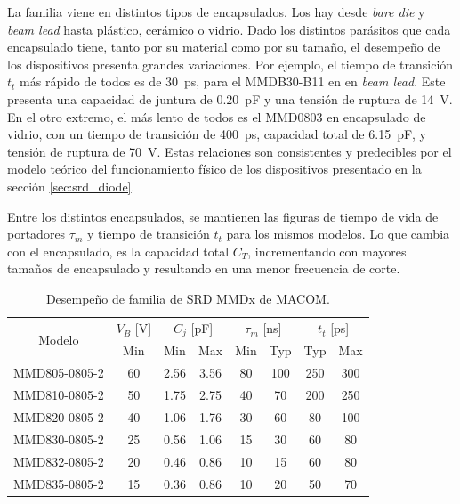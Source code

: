 La familia viene en distintos tipos de encapsulados. Los hay desde \textit{bare
die} y \textit{beam lead} hasta plástico, cerámico o vidrio. Dado los distintos
parásitos que cada encapsulado tiene, tanto por su material como por su tamaño,
el desempeño de los dispositivos presenta grandes variaciones. Por ejemplo, el
tiempo de transición $t_t$ más rápido de todos es de \qty{30}{\pico\second},
para el MMDB30-B11 en en \textit{beam lead}. Este presenta una capacidad de
juntura de \qty{0.20}{\pico\farad} y una tensión de ruptura de \qty{14}{\volt}.
En el otro extremo, el más lento de todos es el MMD0803 en encapsulado de
vidrio, con un tiempo de transición de \qty{400}{\pico\second}, capacidad total
de \qty{6.15}{\pico\farad}, y tensión de ruptura de \qty{70}{\volt}. Estas
relaciones son consistentes y predecibles por el modelo teórico del
funcionamiento físico de los dispositivos presentado en la sección
\ref{sec:srd_diode}.

Entre los distintos encapsulados, se mantienen las figuras de tiempo de vida de
portadores $\tau_m$ y tiempo de transición $t_t$ para los mismos modelos. Lo que
cambia con el encapsulado, es la capacidad total $C_T$, incrementando con
mayores tamaños de encapsulado y resultando en una menor frecuencia de corte.

\begin{table}[t]
\centering
\begin{tabular}{|c|c|c|c|c|c|c|c|}
\hline
    \multirow{2}{*}{Modelo} & $V_B$ [V] &
    \multicolumn{2}{c|}{$C_j$ [pF]} & \multicolumn{2}{c|}{$\tau_m$ [ns]} &
    \multicolumn{2}{c|}{$t_t$ [ps]} \\
\cline{2-8}
    & Min & Min & Max & Min & Typ & Typ & Max \\
\hline
MMD805-0805-2 & 60 & 2.56 & 3.56 & 80 & 100 & 250 & 300 \\
MMD810-0805-2 & 50 & 1.75 & 2.75 & 40 & 70  & 200 & 250 \\
MMD820-0805-2 & 40 & 1.06 & 1.76 & 30 & 60  & 80  & 100 \\
MMD830-0805-2 & 25 & 0.56 & 1.06 & 15 & 30  & 60  & 80 \\
MMD832-0805-2 & 20 & 0.46 & 0.86 & 10 & 15  & 60  & 80 \\
MMD835-0805-2 & 15 & 0.36 & 0.86 & 10 & 20  & 50  & 70 \\
\hline
\end{tabular}
\caption{Desempeño de familia de SRD MMDx de MACOM.}
\label{tab:mmdx_performance}
\end{table}

